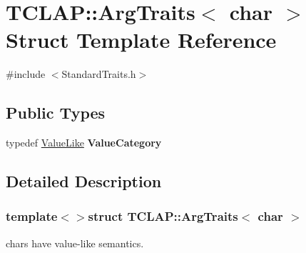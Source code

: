 \hypertarget{struct_t_c_l_a_p_1_1_arg_traits_3_01char_01_4}{\section{T\-C\-L\-A\-P\-:\-:Arg\-Traits$<$ char $>$ Struct Template Reference}
\label{struct_t_c_l_a_p_1_1_arg_traits_3_01char_01_4}
}


{\ttfamily \#include $<$Standard\-Traits.\-h$>$}

\subsection*{Public Types}
\begin{DoxyCompactItemize}
\item 
\hypertarget{struct_t_c_l_a_p_1_1_arg_traits_3_01char_01_4_a36f7fe1b3b1649ef8ec08ef7d6fc3160}{typedef \hyperlink{struct_t_c_l_a_p_1_1_value_like}{Value\-Like} {\bfseries Value\-Category}}\label{struct_t_c_l_a_p_1_1_arg_traits_3_01char_01_4_a36f7fe1b3b1649ef8ec08ef7d6fc3160}

\end{DoxyCompactItemize}


\subsection{Detailed Description}
\subsubsection*{template$<$$>$struct T\-C\-L\-A\-P\-::\-Arg\-Traits$<$ char $>$}

chars have value-\/like semantics. 